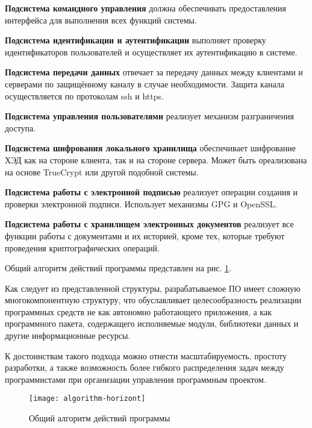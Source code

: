 \vspace{\baselineskip}
\textbf{Подсистема командного управления} должна обеспечивать предоставления интерфейса для выполнения всех функций системы.

\vspace{\baselineskip}
\textbf{Подсистема идентификации и аутентификации} выполняет проверку идентификаторов пользователей и осуществляет их аутентификацию в системе.

\vspace{\baselineskip}
\textbf{Подсистема передачи данных} отвечает за передачу данных между клиентами и серверами по защищённому каналу в случае необходимости. Защита канала осуществляется по протоколам ssh и https.

\vspace{\baselineskip}
\textbf{Подсистема управления пользователями} реализует механизм разграничения доступа.

\vspace{\baselineskip}
\textbf{Подсистема шифрования локального хранилища} обеспечивает шифрование ХЭД как на стороне клиента, так и на стороне сервера. Может быть ореализована на основе TrueCrypt или другой подобной системы.

\vspace{\baselineskip}
\textbf{Подсистема работы с электронной подписью} реализует операции создания и проверки электронной подписи. Использует механизмы GPG и OpenSSL.

\vspace{\baselineskip}
\textbf{Подсистема работы с хранилищем электронных документов} реализует все функции работы с документами и их историей, кроме тех, которые требуют проведения криптографических операций.

\vspace{\baselineskip}
Общий алгоритм действий программы представлен на рис. \ref{img:algorithm-horizont}.

\vspace{\baselineskip}
Как следует из представленной структуры, разрабатываемое ПО имеет сложную многокомпонентную структуру, что обуславливает целесообразность реализации программных средств не как автономно работающего приложения, а как программного пакета, содержащего исполняемые модули, библиотеки данных и другие информационные ресурсы.

\vspace{\baselineskip}
К достоинствам такого подхода можно отнести масштабируемость, простоту разработки, а также возможность более гибкого распределения задач между программистами при организации управления программным проектом.

\begin{landscape}
\begin{figure}[h!]
  \centering
  \texttt{[image: algorithm-horizont]}
  \caption{Общий алгоритм действий программы}
  \label{img:algorithm-horizont}
\end{figure}
\end{landscape}